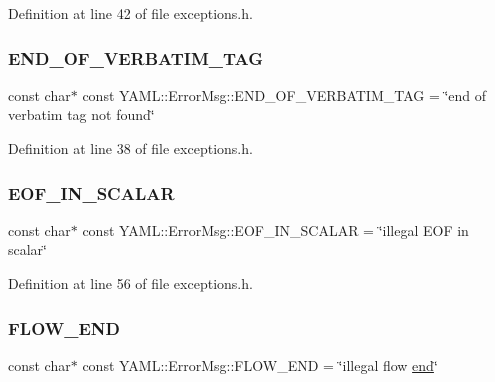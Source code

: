 Definition at line 42 of file exceptions.\+h.

\mbox{\label{namespace_y_a_m_l_1_1_error_msg_aae2fec70d0404ff3f0a8796f3359ea34}} 
\subsubsection{\texorpdfstring{END\_OF\_VERBATIM\_TAG}{END\_OF\_VERBATIM\_TAG}}
{\footnotesize\ttfamily const char$\ast$ const Y\+A\+M\+L\+::\+Error\+Msg\+::\+E\+N\+D\+\_\+\+O\+F\+\_\+\+V\+E\+R\+B\+A\+T\+I\+M\+\_\+\+T\+AG = \char`\"{}end of verbatim tag not found\char`\"{}}



Definition at line 38 of file exceptions.\+h.

\mbox{\label{namespace_y_a_m_l_1_1_error_msg_ad034e48a4f09b9dfef55b0a6ff319074}} 
\subsubsection{\texorpdfstring{EOF\_IN\_SCALAR}{EOF\_IN\_SCALAR}}
{\footnotesize\ttfamily const char$\ast$ const Y\+A\+M\+L\+::\+Error\+Msg\+::\+E\+O\+F\+\_\+\+I\+N\+\_\+\+S\+C\+A\+L\+AR = \char`\"{}illegal E\+OF in scalar\char`\"{}}



Definition at line 56 of file exceptions.\+h.

\mbox{\label{namespace_y_a_m_l_1_1_error_msg_a72672ee0f08be49c4a3c0aecca3c3344}} 
\subsubsection{\texorpdfstring{FLOW\_END}{FLOW\_END}}
{\footnotesize\ttfamily const char$\ast$ const Y\+A\+M\+L\+::\+Error\+Msg\+::\+F\+L\+O\+W\+\_\+\+E\+ND = \char`\"{}illegal flow \mbox{\hyperlink{glad_8h_a432111147038972f06e049e18a837002}{end}}\char`\"{}}



